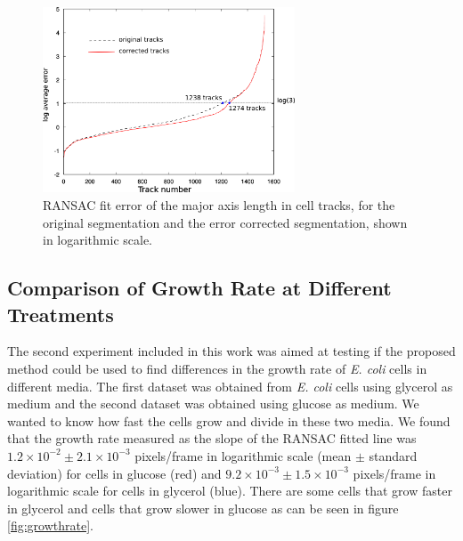 \documentclass[journal]{IEEEtran}
\begin{document}
\begin{figure}[h]
	\begin{center}
		
		\includegraphics[width=7.5cm]{correcttrack2.png}					
		\caption{RANSAC fit error of the major axis length in cell tracks, for the original segmentation and the error corrected segmentation, shown in logarithmic scale.}
		\label{fig:correcttrack}
	\end{center}
\end{figure}

\subsection{Comparison of Growth Rate at Different Treatments}
The second experiment included in this work was aimed at testing if the proposed method could be used to find differences in the growth rate of \textit{E. coli} cells in different media. The first dataset was obtained from \textit{E. coli} cells using glycerol as medium and the second dataset was obtained using glucose as medium. We wanted to know how fast the cells grow and divide in these two media. We found that the growth rate measured as the slope of the RANSAC fitted line was $1.2 \times 10^{-2} \pm 2.1 \times 10^{-3}$ pixels/frame in logarithmic scale (mean $\pm$ standard deviation) for cells in glucose (red) and $9.2 \times 10^{-3} \pm 1.5 \times 10^{-3}$ pixels/frame in logarithmic scale for cells in glycerol (blue). There are some cells that grow faster in glycerol and cells that grow slower in glucose as can be seen in figure \ref{fig:growthrate}.
\end{document}
